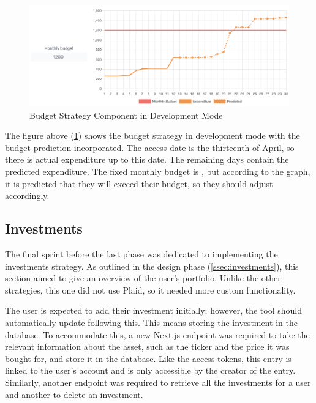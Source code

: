 \vspace{2\baselineskip}
\begin{figure}[H]
	\centering
	\includegraphics[width=\textwidth]{images/budget_strategy.png}
	\caption{Budget Strategy Component in Development Mode}
	\label{fig:BudgetStrategy}
\end{figure}

The figure above (\ref{fig:BudgetStrategy}) shows the budget strategy in development mode with the budget prediction incorporated. The access date is the thirteenth of April, so there is actual expenditure up to this date. The remaining days contain the predicted expenditure. The fixed monthly budget is , but according to the graph, it is predicted that they will exceed their budget, so they should adjust accordingly.

\subsection{Investments}
The final sprint before the last phase was dedicated to implementing the investments strategy. As outlined in the design phase (\ref{ssec:investments}), this section aimed to give an overview of the user's portfolio. Unlike the other strategies, this one did not use Plaid, so it needed more custom functionality.

The user is expected to add their investment initially; however, the tool should automatically update following this. This means storing the investment in the database. To accommodate this, a new Next.js endpoint was required to take the relevant information about the asset, such as the ticker and the price it was bought for, and store it in the database. Like the access tokens, this entry is linked to the user's account and is only accessible by the creator of the entry. Similarly, another endpoint was required to retrieve all the investments for a user and another to delete an investment.

